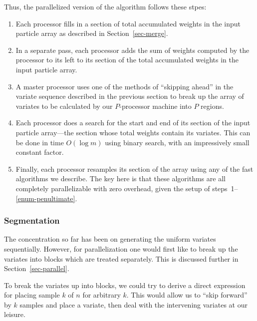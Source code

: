 \documentclass[12pt]{article}
\begin{document}
  Thus, the parallelized version of the algorithm follows
  these stpes:
  \begin{enumerate}
  \item Each processor fills in a section of total
    accumulated weights in the input particle array as
    described in Section~\ref{sec-merge}.
  \item In a separate pass, each processor adds the sum of
    weights computed by the processor to its left to its
    section of the total accumulated weights in the input
    particle array.
  \item A master processor uses one of the methods of
    ``skipping ahead'' in the variate
    sequence described in the previous section to break up the
    array of variates to be calculated by our $P$-processor
    machine into $P$ regions.
  \item \label{enum-penultimate} Each processor does a search for the start and end
    of its section of the input particle array---the section
    whose total weights contain its variates.  This can be done in time
    $O(\log m)$ using binary search, with an impressively
    small constant factor.
  \item Finally, each processor resamples its section of the array
    using any of the fast algorithms we describe.  The key
    here is that these algorithms are all completely
    parallelizable with zero overhead, given the setup of
    steps~1--\ref{enum-penultimate}.
  \end{enumerate}


\subsubsection{Segmentation}\label{sec-segment}

  The concentration so far has been on generating the uniform
  variates sequentially.  However, for parallelization one
  would first like to break up the variates into blocks which
  are treated separately.  This is discussed further in
  Section~\ref{sec-parallel}.

  To break the variates up into blocks, we could try to
  derive a direct expression for placing sample $k$ of $n$
  for arbitrary $k$.  This would allow us to ``skip forward''
  by $k$ samples and place a variate, then deal with the
  intervening variates at our leisure.
\end{document}

